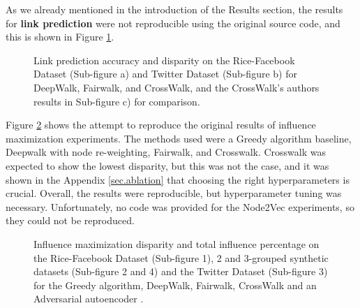 As we already mentioned in the introduction of the Results section, the results for \textbf{link prediction} were not reproducible using the original source code, and this is shown in Figure \ref{fig:link-prediction}.

\begin{figure}[H]
    \centering
    \hfill
    \hfill
    \caption{Link prediction accuracy and disparity on the Rice-Facebook Dataset (Sub-figure a) and Twitter Dataset (Sub-figure b) for DeepWalk, Fairwalk, and CrossWalk, and the CrossWalk's authors results in Sub-figure c) for comparison.}%
    \label{fig:link-prediction}%
\end{figure}

Figure \ref{fig:infmax} shows the attempt to reproduce the original results of influence maximization experiments. The methods used were a Greedy algorithm baseline, Deepwalk with node re-weighting, Fairwalk, and Crosswalk. Crosswalk was expected to show the lowest disparity, but this was not the case, and it was shown in the Appendix \ref{sec.ablation} that choosing the right hyperparameters is crucial. Overall, the results were reproducible, but hyperparameter tuning was necessary. Unfortunately, no code was provided for the Node2Vec experiments, so they could not be reproduced. \\
\begin{figure}[h]
\centering
{}
\caption{Influence maximization disparity and total influence percentage on the Rice-Facebook Dataset (Sub-figure 1), 2 and 3-grouped synthetic datasets (Sub-figure 2 and 4) and the Twitter Dataset (Sub-figure 3) for the Greedy algorithm,  DeepWalk, Fairwalk, CrossWalk and an Adversarial autoencoder \cite{aae}.}
\label{fig:infmax}
\end{figure}

